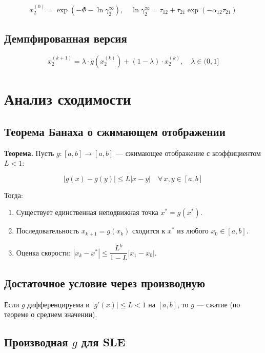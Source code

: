 \documentclass[11pt]{article}
\begin{document}
\begin{equation*}
x_2^{(0)} = \exp\!\left(-\Phi - \ln \gamma_2^\infty\right), \quad \ln \gamma_2^\infty = \tau_{12} + \tau_{21}\exp(-\alpha_{12}\tau_{21})
\end{equation*}

\subsection{Демпфированная версия}

\begin{equation*}
x_2^{(k+1)} = \lambda \cdot g(x_2^{(k)}) + (1 - \lambda) \cdot x_2^{(k)}, \quad \lambda \in (0, 1]
\end{equation*}

\section{Анализ сходимости}

\subsection{Теорема Банаха о сжимающем отображении}

\textbf{Теорема.} Пусть $g: [a, b] \to [a, b]$ --- сжимающее отображение с коэффициентом $L < 1$:

\begin{equation*}
|g(x) - g(y)| \leq L |x - y| \quad \forall \, x, y \in [a, b]
\end{equation*}

Тогда:
\begin{enumerate}
  \item Существует единственная неподвижная точка $x^{*} = g(x^{*})$.
  \item Последовательность $x_{k+1} = g(x_k)$ сходится к $x^{*}$ из любого $x_0 \in [a, b]$.
  \item Оценка скорости: $|x_k - x^{*}| \leq \dfrac{L^k}{1 - L}|x_1 - x_0|$.
\end{enumerate}

\subsection{Достаточное условие через производную}

Если $g$ дифференцируема и $|g'(x)| \leq L < 1$ на $[a, b]$, то $g$ --- сжатие (по теореме о среднем значении).

\subsection{Производная $g$ для SLE}
\end{document}
